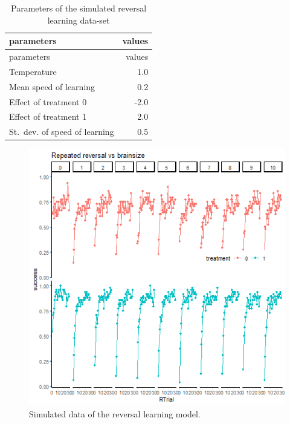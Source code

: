 \documentclass[
]{article}
\begin{document}
\begin{longtable}[]{@{}lr@{}}
\caption{\label{tab:param_rev} Parameters of the simulated reversal
learning data-set}\tabularnewline
\toprule\noalign{}
parameters & values \\
\midrule\noalign{}
\endfirsthead
\toprule\noalign{}
parameters & values \\
\midrule\noalign{}
\endhead
\bottomrule\noalign{}
\endlastfoot
Temperature & 1.0 \\
Mean speed of learning & 0.2 \\
Effect of treatment 0 & -2.0 \\
Effect of treatment 1 & 2.0 \\
St.~dev. of speed of learning & 0.5 \\
\end{longtable}

\begin{figure}

\includegraphics{reversal_data} \hfill{}

\caption{Simulated data of the reversal learning model.}\label{fig:rev_sim_data}
\end{figure}
\end{document}
